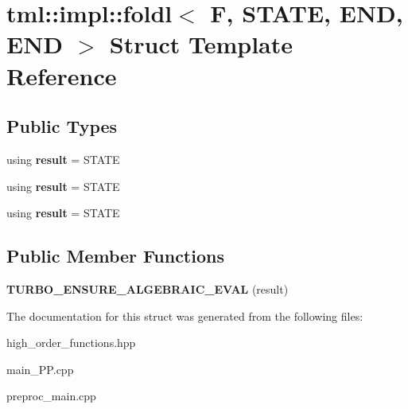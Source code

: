\hypertarget{structtml_1_1impl_1_1foldl_3_01F_00_01STATE_00_01END_00_01END_01_4}{\section{tml\+:\+:impl\+:\+:foldl$<$ F, S\+T\+A\+T\+E, E\+N\+D, E\+N\+D $>$ Struct Template Reference}
\label{structtml_1_1impl_1_1foldl_3_01F_00_01STATE_00_01END_00_01END_01_4}
}
\subsection*{Public Types}
\begin{DoxyCompactItemize}
\item 
\hypertarget{structtml_1_1impl_1_1foldl_3_01F_00_01STATE_00_01END_00_01END_01_4_a8003ed00cb38384ab91e33b7bdfefb10}{using {\bfseries result} = S\+T\+A\+T\+E}\label{structtml_1_1impl_1_1foldl_3_01F_00_01STATE_00_01END_00_01END_01_4_a8003ed00cb38384ab91e33b7bdfefb10}

\item 
\hypertarget{structtml_1_1impl_1_1foldl_3_01F_00_01STATE_00_01END_00_01END_01_4_a8003ed00cb38384ab91e33b7bdfefb10}{using {\bfseries result} = S\+T\+A\+T\+E}\label{structtml_1_1impl_1_1foldl_3_01F_00_01STATE_00_01END_00_01END_01_4_a8003ed00cb38384ab91e33b7bdfefb10}

\item 
\hypertarget{structtml_1_1impl_1_1foldl_3_01F_00_01STATE_00_01END_00_01END_01_4_a8003ed00cb38384ab91e33b7bdfefb10}{using {\bfseries result} = S\+T\+A\+T\+E}\label{structtml_1_1impl_1_1foldl_3_01F_00_01STATE_00_01END_00_01END_01_4_a8003ed00cb38384ab91e33b7bdfefb10}

\end{DoxyCompactItemize}
\subsection*{Public Member Functions}
\begin{DoxyCompactItemize}
\item 
\hypertarget{structtml_1_1impl_1_1foldl_3_01F_00_01STATE_00_01END_00_01END_01_4_af779cc468c5410c35f99e7dd032d42e2}{{\bfseries T\+U\+R\+B\+O\+\_\+\+E\+N\+S\+U\+R\+E\+\_\+\+A\+L\+G\+E\+B\+R\+A\+I\+C\+\_\+\+E\+V\+A\+L} (result)}\label{structtml_1_1impl_1_1foldl_3_01F_00_01STATE_00_01END_00_01END_01_4_af779cc468c5410c35f99e7dd032d42e2}

\end{DoxyCompactItemize}


The documentation for this struct was generated from the following files\+:\begin{DoxyCompactItemize}
\item 
high\+\_\+order\+\_\+functions.\+hpp\item 
main\+\_\+\+P\+P.\+cpp\item 
preproc\+\_\+main.\+cpp\end{DoxyCompactItemize}

